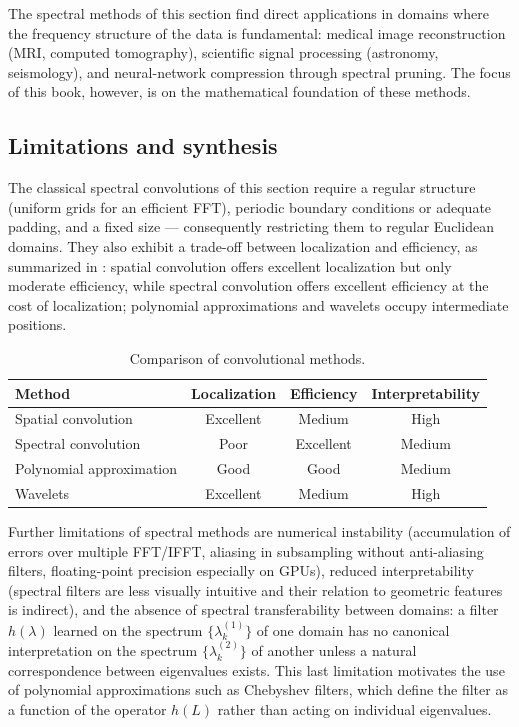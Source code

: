 The spectral methods of this section find direct applications in domains where
the frequency structure of the data is fundamental: medical image reconstruction
(MRI, computed tomography), scientific signal processing (astronomy,
seismology), and neural-network compression through spectral pruning. The focus
of this book, however, is on the mathematical foundation of these methods.

\subsection{Limitations and synthesis}
\label{sec:grids:spectral-limits}

The classical spectral convolutions of this section require a regular structure
(uniform grids for an efficient FFT), periodic boundary conditions or adequate
padding, and a fixed size --- consequently restricting them to regular Euclidean
domains. They also exhibit a trade-off between localization and efficiency, as
summarized in : spatial convolution offers excellent
localization but only moderate efficiency, while spectral convolution offers
excellent efficiency at the cost of localization; polynomial approximations and
wavelets occupy intermediate positions.

\begin{table}[h]
\centering
\caption{Comparison of convolutional methods.}
\label{tab:grids:methods}
\begin{tabular}{@{}lccc@{}}
\toprule
\textbf{Method} & \textbf{Localization} & \textbf{Efficiency} & \textbf{Interpretability} \\
\midrule
Spatial convolution     & Excellent & Medium    & High   \\
Spectral convolution    & Poor      & Excellent & Medium \\
Polynomial approximation & Good     & Good      & Medium \\
Wavelets                & Excellent & Medium    & High   \\
\bottomrule
\end{tabular}
\end{table}

Further limitations of spectral methods are numerical instability (accumulation
of errors over multiple FFT/IFFT, aliasing in subsampling without anti-aliasing
filters, floating-point precision especially on GPUs), reduced interpretability
(spectral filters are less visually intuitive and their relation to geometric
features is indirect), and the absence of spectral transferability between
domains: a filter $h(\lambda)$ learned on the spectrum
$\{\lambda_k^{(1)}\}$ of one domain has no canonical interpretation on the
spectrum $\{\lambda_k^{(2)}\}$ of another unless a natural correspondence between
eigenvalues exists. This last limitation motivates the use of polynomial
approximations such as Chebyshev filters, which define the filter as a function
of the operator $h(L)$ rather than acting on individual eigenvalues.

